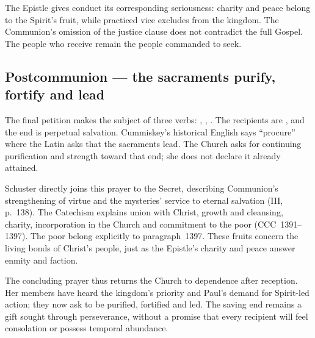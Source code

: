 The Epistle gives conduct its corresponding seriousness: charity and peace
belong to the Spirit's fruit, while practiced vice excludes from the kingdom.
The Communion's omission of the justice clause does not contradict the full
Gospel. The people who receive remain the people commanded to seek.

\subsection*{Postcommunion --- the sacraments purify, fortify and lead\enspace{}}\label{postcommunion-treatment}

The final petition makes  the subject of three verbs:
, , . The recipients are
, and the end is perpetual salvation. Cummiskey's historical
English says ``procure'' where the Latin asks that the sacraments lead. The
Church asks for continuing purification and strength toward that end; she
does not declare it already attained.

Schuster directly joins this prayer to the Secret, describing Communion's
strengthening of virtue and the mysteries' service to eternal salvation
(III, p.~138). The Catechism explains union with Christ, growth and cleansing,
charity, incorporation in the Church and commitment to the poor
(CCC~1391--1397). The poor belong explicitly to paragraph~1397. These
fruits concern the living bonds of Christ's people, just as the Epistle's
charity and peace answer enmity and faction.

The concluding prayer thus returns the Church to dependence after reception.
Her members have heard the kingdom's priority and Paul's demand for
Spirit-led action; they now ask to be purified, fortified and led. The
saving end remains a gift sought through perseverance, without a promise
that every recipient will feel consolation or possess temporal abundance.
